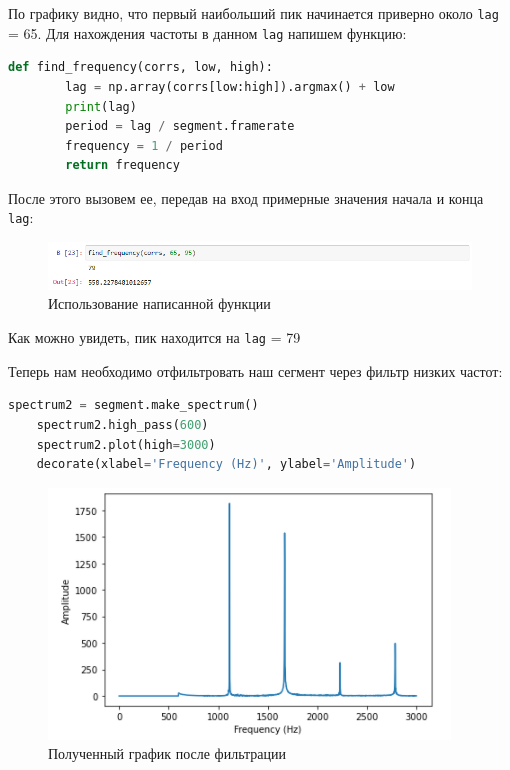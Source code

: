 \documentclass[a4paper]{article}
\begin{document}
            По графику видно, что первый наибольший пик начинается приверно около \texttt{lag} = 65. Для нахождения частоты в данном \texttt{lag} напишем функцию:
            
\begin{lstlisting}[language=Python, caption= Функция для нахождения частоты]
    def find_frequency(corrs, low, high):
        lag = np.array(corrs[low:high]).argmax() + low
        print(lag)
        period = lag / segment.framerate
        frequency = 1 / period
        return frequency
\end{lstlisting}   
            
            После этого вызовем ее, передав на вход примерные значения начала и конца \texttt{lag}:
            
            \begin{figure}[H]
                \centering
                \includegraphics[width=\textwidth]{ex_4_freq.png}
                \caption{Использование написанной функции}
                \label{fig:ex_4_freq}
            \end{figure}
            
            Как можно увидеть, пик находится на \texttt{lag} = 79
            
            Теперь нам необходимо отфильтровать наш сегмент через фильтр низких частот:
            
\begin{lstlisting}[language=Python, caption= Фильтрация сегмента]
    spectrum2 = segment.make_spectrum()
    spectrum2.high_pass(600)
    spectrum2.plot(high=3000)
    decorate(xlabel='Frequency (Hz)', ylabel='Amplitude')
\end{lstlisting}               
            
            \begin{figure}[H]
                \centering
                \includegraphics{ex_4_filter_spectr.png}
                \caption{Полученный график после фильтрации}
                \label{fig:ex_4_filter_spectr}
            \end{figure}
            
\end{document}
